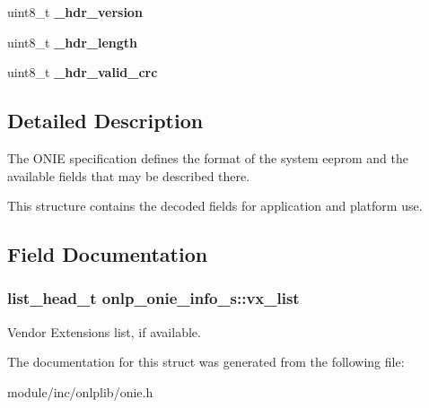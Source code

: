 \begin{DoxyCompactItemize}
\item 
\hypertarget{structonlp__onie__info__s_ac2655b096ba7a6b327e227300a46bb1b}{uint8\+\_\+t {\bfseries \+\_\+hdr\+\_\+version}}\label{structonlp__onie__info__s_ac2655b096ba7a6b327e227300a46bb1b}

\item 
\hypertarget{structonlp__onie__info__s_aec65173ecfcfc08be9bb468c6df166ae}{uint8\+\_\+t {\bfseries \+\_\+hdr\+\_\+length}}\label{structonlp__onie__info__s_aec65173ecfcfc08be9bb468c6df166ae}

\item 
\hypertarget{structonlp__onie__info__s_a62496661023c605b6fd95c615916bb9b}{uint8\+\_\+t {\bfseries \+\_\+hdr\+\_\+valid\+\_\+crc}}\label{structonlp__onie__info__s_a62496661023c605b6fd95c615916bb9b}

\end{DoxyCompactItemize}


\subsection{Detailed Description}
The O\+N\+I\+E specification defines the format of the system eeprom and the available fields that may be described there.

This structure contains the decoded fields for application and platform use. 

\subsection{Field Documentation}
\hypertarget{structonlp__onie__info__s_a4ddf24a84601e4a767a1002375766f0a}{
\subsubsection[{vx\+\_\+list}]{\setlength{\rightskip}{0pt plus 5cm}list\+\_\+head\+\_\+t onlp\+\_\+onie\+\_\+info\+\_\+s\+::vx\+\_\+list}}\label{structonlp__onie__info__s_a4ddf24a84601e4a767a1002375766f0a}
Vendor Extensions list, if available. 

The documentation for this struct was generated from the following file\+:\begin{DoxyCompactItemize}
\item 
module/inc/onlplib/onie.\+h\end{DoxyCompactItemize}
